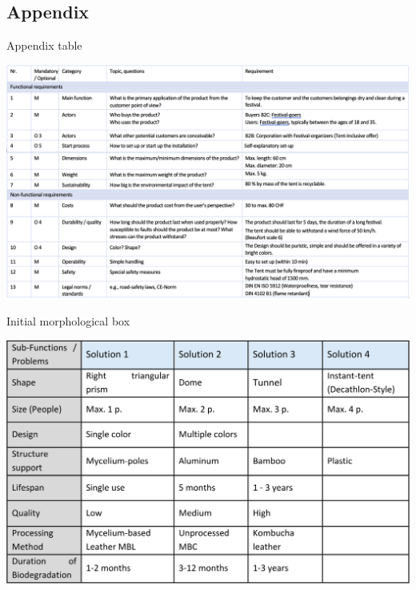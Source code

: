 \documentclass{article}
\begin{document}
\newpage
\thispagestyle{empty}
\begin{landscape}
    \section{Appendix}
    \label{sec:appendix}
    \begin{table}[ht!]
        \centering
        \caption{Appendix table}
        \label{tab:appendix}
        \includegraphics[width=1.5\textwidth]{media/appendix.png}
    \end{table}
\end{landscape}
\newpage

\begin{table}[ht!]
    \centering
    \caption{Initial morphological box}
    \label{tab:initial_morph}
    \includegraphics[width=\textwidth]{media/initial_morph.png}
\end{table}
\end{document}
